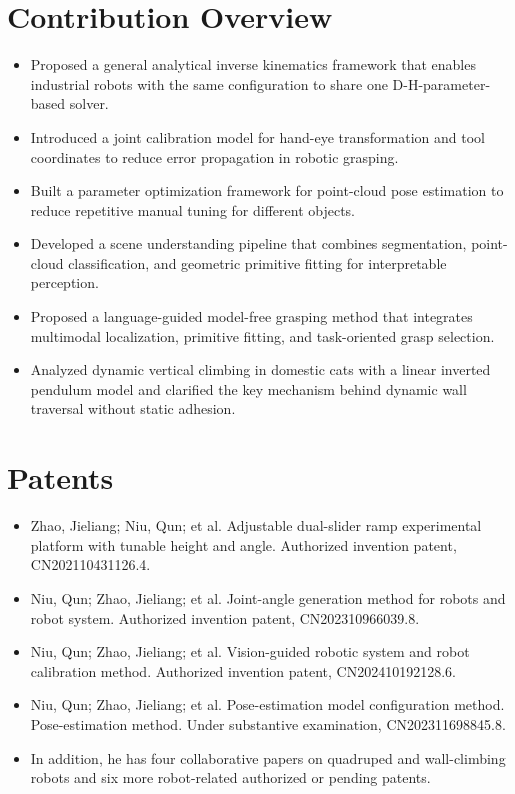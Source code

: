 \documentclass[11pt,a4paper]{article}
\begin{document}
\section*{Contribution Overview}
\begin{itemize}
	\item Proposed a general analytical inverse kinematics framework that enables industrial robots with the same configuration to share one D-H-parameter-based solver.
	\item Introduced a joint calibration model for hand-eye transformation and tool coordinates to reduce error propagation in robotic grasping.
	\item Built a parameter optimization framework for point-cloud pose estimation to reduce repetitive manual tuning for different objects.
	\item Developed a scene understanding pipeline that combines segmentation, point-cloud classification, and geometric primitive fitting for interpretable perception.
	\item Proposed a language-guided model-free grasping method that integrates multimodal localization, primitive fitting, and task-oriented grasp selection.
	\item Analyzed dynamic vertical climbing in domestic cats with a linear inverted pendulum model and clarified the key mechanism behind dynamic wall traversal without static adhesion.
\end{itemize}

\section*{Patents}
\begin{itemize}
	\item Zhao, Jieliang; Niu, Qun; et al. Adjustable dual-slider ramp experimental platform with tunable height and angle. Authorized invention patent, CN202110431126.4.
	\item Niu, Qun; Zhao, Jieliang; et al. Joint-angle generation method for robots and robot system. Authorized invention patent, CN202310966039.8.
	\item Niu, Qun; Zhao, Jieliang; et al. Vision-guided robotic system and robot calibration method. Authorized invention patent, CN202410192128.6.
	\item Niu, Qun; Zhao, Jieliang; et al. Pose-estimation model configuration method. Pose-estimation method. Under substantive examination, CN202311698845.8.
	\item In addition, he has four collaborative papers on quadruped and wall-climbing robots and six more robot-related authorized or pending patents.
\end{itemize}
\end{document}
